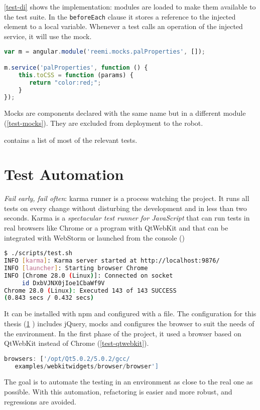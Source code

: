 

\ref{test-di} shows the implementation: modules are loaded to make them available to the test suite.
In the \texttt{beforeEach} clause it stores a reference to the injected element to a local variable.
Whenever a test calls an operation of the injected service, it will use the mock.

\begin{lstlisting}[label=test-mocks,language=javascript, caption=Mocks]
var m = angular.module('reemi.mocks.palProperties', []);

m.service('palProperties', function () {
	this.toCSS = function (params) {
       return "color:red;";
	}
});
\end{lstlisting}

Mocks are components declared with the same name but in a different module (\ref{test-mocks}).
They are excluded from deployment to the robot.

 contains a list of most of the relevant tests.

\section{Test Automation}
\emph{Fail early, fail often}: karma runner is a process watching the project. 
It runs all tests on every change without disturbing the development and in less than two seconds.
Karma is a \textit{spectacular test runner for JavaScript} that can run tests in real browsers like Chrome or a program with QtWebKit and that can be integrated with WebStorm or launched from the console ()

\begin{lstlisting}[label=test-launch-karma,language=bash, caption=Launching Karma Runner]
$ ./scripts/test.sh
INFO [karma]: Karma server started at http://localhost:9876/
INFO [launcher]: Starting browser Chrome
INFO [Chrome 28.0 (Linux)]: Connected on socket 
     id DxbVJNX0jIoe1CbaWf9V
Chrome 28.0 (Linux): Executed 143 of 143 SUCCESS 
(0.843 secs / 0.432 secs)
\end{lstlisting}

It can be installed with \ac{npm} and configured with a file.
The configuration for this thesis (\ref{} ) includes jQuery, mocks and configures the browser to suit the needs of  the environment.
In the first phase of the project, it used a browser based on QtWebKit instead of Chrome (\ref{test-qtwebkit}).

\begin{lstlisting}[label=test-qtwebkit,language=javascript, caption=Configuration to use QtWebkit browser]
browsers: ['/opt/Qt5.0.2/5.0.2/gcc/
   examples/webkitwidgets/browser/browser']
\end{lstlisting}

The goal is to automate the testing in an environment as close to the real one as possible.  
With this automation, refactoring is easier and more robust, and regressions are avoided.
